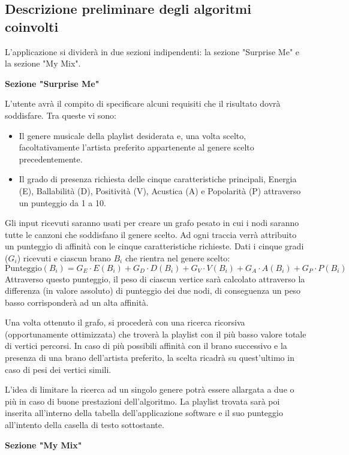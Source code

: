 \documentclass[12pt, a4paper]{article}
\begin{document}
\subsection{Descrizione preliminare degli algoritmi coinvolti}
L'applicazione si dividerà in due sezioni indipendenti: la sezione "Surprise Me" e la sezione "My Mix".

\textbf{Sezione "Surprise Me"}

L’utente avrà il compito di specificare alcuni requisiti che il risultato dovrà soddisfare. Tra queste vi sono:
\begin{itemize}
\item Il genere musicale della playlist desiderata e, una volta scelto, facoltativamente l’artista preferito appartenente al genere scelto precedentemente.
\item Il grado di presenza richiesta delle cinque caratteristiche principali, Energia (E), Ballabilità (D), Positività (V), Acustica (A) e Popolarità (P) attraverso un punteggio da 1 a 10.
\end{itemize}

Gli input ricevuti saranno usati per creare un grafo pesato in cui i nodi saranno tutte le canzoni che soddisfano il genere scelto.
Ad ogni traccia verrà attribuito un punteggio di affinità con le cinque caratteristiche richieste.
Dati i cinque gradi ($G_i$) ricevuti e ciascun brano $B_i$ che rientra nel genere scelto:
$$ \text{Punteggio}(B_i) = G_E \cdot E(B_i) + G_D \cdot D(B_i) + G_V \cdot V(B_i) + G_A \cdot A(B_i) + G_P \cdot P(B_i) $$
Attraverso questo punteggio, il peso di ciascun vertice sarà calcolato attraverso la differenza (in valore assoluto) di punteggio dei due nodi, di conseguenza un peso basso corrisponderà ad un alta affinità. \par
Una volta ottenuto il grafo, si procederà con una ricerca ricorsiva (opportunamente ottimizzata) che troverà la playlist con il più basso valore totale di vertici percorsi. In caso di più possibili affinità con il brano successivo e la presenza di una brano dell’artista preferito, la scelta ricadrà su quest’ultimo in caso di pesi dei vertici simili. \par
L’idea di limitare la ricerca ad un singolo genere potrà essere allargata a due o più in caso di buone prestazioni dell’algoritmo.
La playlist trovata sarà poi inserita all’interno della tabella dell’applicazione software e il suo punteggio all’intento della casella di testo sottostante.

\newpage
\textbf{Sezione "My Mix"}
\end{document}
